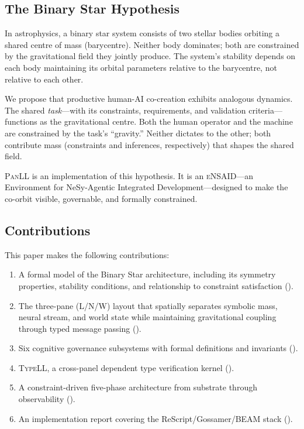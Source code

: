 \documentclass[11pt,a4paper]{article}
\newcommand{\panll}{\textsc{PanLL}}
\newcommand{\typell}{\textsc{TypeLL}}
\newcommand{\ensaid}{\textsc{eNSAID}}
\begin{document}
\subsection{The Binary Star Hypothesis}

In astrophysics, a binary star system consists of two stellar bodies
orbiting a shared centre of mass (barycentre). Neither body dominates;
both are constrained by the gravitational field they jointly produce.
The system's stability depends on each body maintaining its orbital
parameters relative to the barycentre, not relative to each other.

We propose that productive human-AI co-creation exhibits analogous
dynamics. The shared \textit{task}---with its constraints, requirements,
and validation criteria---functions as the gravitational centre. Both
the human operator and the machine are constrained by the task's
``gravity.'' Neither dictates to the other; both contribute mass
(constraints and inferences, respectively) that shapes the shared
field.

\panll{} is an implementation of this hypothesis. It is an \ensaid{}---an
Environment for NeSy-Agentic Integrated Development---designed to
make the co-orbit visible, governable, and formally constrained.

\subsection{Contributions}

This paper makes the following contributions:

\begin{enumerate}
  \item A formal model of the Binary Star architecture, including its
    symmetry properties, stability conditions, and relationship to
    constraint satisfaction ().
  \item The three-pane (L/N/W) layout that spatially separates symbolic
    mass, neural stream, and world state while maintaining
    gravitational coupling through typed message passing
    ().
  \item Six cognitive governance subsystems with formal definitions and
    invariants ().
  \item \typell{}, a cross-panel dependent type verification kernel
    ().
  \item A constraint-driven five-phase architecture from substrate
    through observability ().
  \item An implementation report covering the ReScript/Gossamer/BEAM stack
    ().
\end{enumerate}
\end{document}
